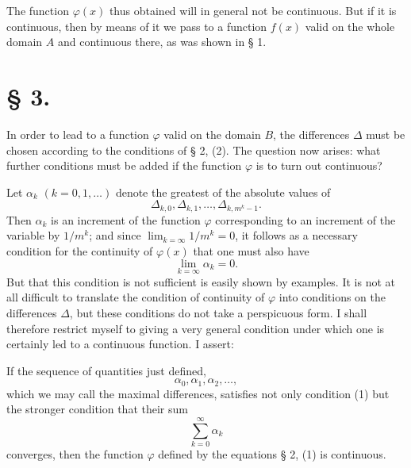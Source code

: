 \documentclass[11pt,a4paper]{article}
\begin{document}
The function $\varphi(x)$ thus obtained will in general not be continuous. But if it is continuous, then by means of it we pass to a function $f(x)$ valid on the whole domain $A$ and continuous there, as was shown in § 1.

\section*{§ 3.}

In order to lead to a function $\varphi$ valid on the domain $B$, the differences $\Delta$ must be chosen according to the conditions of § 2, (2). The question now arises: what further conditions must be added if the function $\varphi$ is to turn out continuous?

Let $\alpha_k$ $(k=0,1,\ldots)$ denote the greatest of the absolute values of
\[
 \Delta_{k,0},\Delta_{k,1},\ldots,\Delta_{k,m^k-1}.
\]
Then $\alpha_k$ is an increment of the function $\varphi$ corresponding to an increment of the variable by $1/m^k$; and since $\lim_{k=\infty}1/m^k=0$, it follows as a necessary condition for the continuity of $\varphi(x)$ that one must also have
\begin{equation}
 \lim_{k=\infty}\alpha_k=0.
\tag{1}
\end{equation}
But that this condition is not sufficient is easily shown by examples. It is not at all difficult to translate the condition of continuity of $\varphi$ into conditions on the differences $\Delta$, but these conditions do not take a perspicuous form. I shall therefore restrict myself to giving a very general condition under which one is certainly led to a continuous function. I assert:

If the sequence of quantities just defined,
\[
 \alpha_0,\alpha_1,\alpha_2,\ldots,
\]
which we may call the maximal differences, satisfies not only condition (1) but the stronger condition that their sum
\begin{equation}
 \sum_{k=0}^{\infty}\alpha_k
\tag{2}
\end{equation}
converges, then the function $\varphi$ defined by the equations § 2, (1) is continuous.
\end{document}
